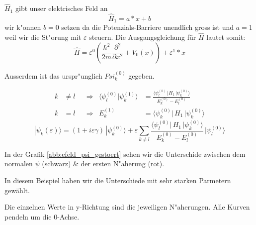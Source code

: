 \begin{refsection}
$\hat H_1$ gibt unser elektrisches Feld an
\[
  \hat H_1 = a*x + b
\]
wir k"onnen $b = 0$ setzen da die Potenzials-Barriere unendlich gross ist und $a = 1$ weil wir die 
St"orung mit $\varepsilon$ steuern.
Die Ausgangsgleichung f\"ur $\hat{H}$ lautet somit:
\[
  \hat{H} = \varepsilon^0 ( \frac{\hbar^2}{2m} \frac{\partial^2}{\partial x^2} + V_0(x) )
            + \varepsilon^1*x
\]

Ausserdem ist das urspr"unglich $Psi_k^(0)$ gegeben.

\begin{equation}
\begin{aligned}
k&\ne l
&&\Rightarrow&
\langle\psi_l^{(0)}|\psi_k^{(1)}\rangle
&=
\frac{\langle \psi_l^{(0)}|\, H_1 \,|\psi_k^{(0)}\rangle}{E_k^{(0)}-E_l^{(0)}}
\\
k&=l
&&\Rightarrow&
E_k^{(1)}
&=
\langle \psi_k^{(0)}|\, H_1 \,|\psi_k^{(0)}\rangle
\end{aligned}
\end{equation}
\begin{equation}
|\psi_k(\varepsilon)\rangle
=
(1+i\varepsilon \gamma)
\,|\psi_k^{(0)}\rangle
+
\varepsilon
\sum_{k\ne l}
\frac{\langle \psi_l^{(0)}|\, H_1 \,|\psi_k^{(0)}\rangle}{E_k^{(0)}-E_l^{(0)}}
\,
|\psi_l^{(0)}\rangle
\end{equation}



In der Grafik \ref{abb:efeld_psi_gestoert} sehen wir die Unterschide zwischen dem normalen $\psi$ (schwarz) \& der ersten N"aherung (rot).

In diesem Beispiel haben wir die Unterschiede mit sehr starken Parmetern gewählt.

Die einzelnen Werte in y-Richtung sind die jeweiligen N"aherungen. Alle Kurven pendeln um die 0-Achse.


\end{refsection}
